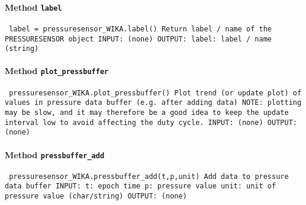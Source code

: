 \paragraph{Method \texttt{label}}
\vspace{1ex}
\texttt{\newline
label = pressuresensor_WIKA.label()\newline
\newline
Return label / name of the PRESSURESENSOR object\newline
\newline
INPUT:\newline
(none)\newline
\newline
OUTPUT:\newline
label: label / name (string)\newline
\newline
}

\paragraph{Method \texttt{plot_pressbuffer}}
\vspace{1ex}
\texttt{\newline
pressuresensor_WIKA.plot_pressbuffer()\newline
\newline
Plot trend (or update plot) of values in pressure data buffer (e.g. after adding data)\newline
NOTE: plotting may be slow, and it may therefore be a good idea to keep the update interval low to avoid affecting the duty cycle.\newline
\newline
INPUT:\newline
(none)\newline
\newline
OUTPUT:\newline
(none)\newline
\newline
}

\paragraph{Method \texttt{pressbuffer_add}}
\vspace{1ex}
\texttt{\newline
pressuresensor_WIKA.pressbuffer_add(t,p,unit)\newline
\newline
Add data to pressure data buffer\newline
\newline
INPUT:\newline
t: epoch time\newline
p: pressure value\newline
unit: unit of pressure value (char/string)\newline
\newline
OUTPUT:\newline
(none)\newline
\newline
}

